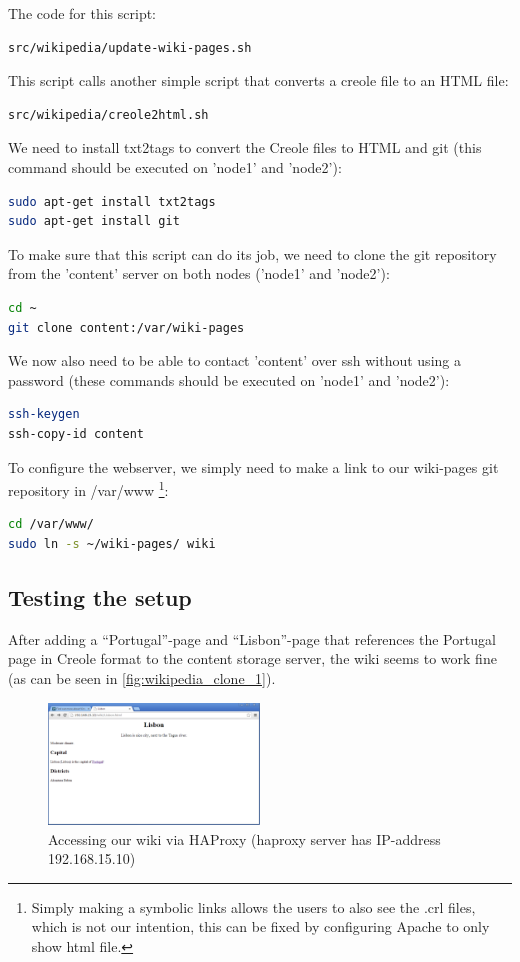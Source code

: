 \documentclass[12pt]{report}
\begin{document}
The code for this script:
 \begin{lstlisting}[language=bash]
src/wikipedia/update-wiki-pages.sh
\end{lstlisting}
This script calls another simple script that converts a creole file to
an HTML file:
 \begin{lstlisting}[language=bash]
src/wikipedia/creole2html.sh
\end{lstlisting}

We need to install txt2tags to convert the Creole files to HTML and git (this
command should be executed on 'node1' and 'node2'):
\begin{lstlisting}[language=bash]
sudo apt-get install txt2tags
sudo apt-get install git
\end{lstlisting}

To make sure that this script can do its job, we need to clone the git
repository from the 'content' server on both nodes ('node1' and 'node2'):
 \begin{lstlisting}[language=bash]
cd ~
git clone content:/var/wiki-pages
\end{lstlisting}
We now also need to be able to contact 'content' over ssh without using
a password (these commands should be executed on 'node1' and 'node2'):
\begin{lstlisting}[language=bash]
ssh-keygen
ssh-copy-id content
\end{lstlisting}

To configure the webserver, we simply need to make a link to our
wiki-pages git repository in /var/www \footnote{Simply making a
  symbolic links allows the users to also see the .crl files, which is
  not our intention, this can be fixed by configuring Apache to only
  show html file.}:
\begin{lstlisting}[language=bash]
cd /var/www/
sudo ln -s ~/wiki-pages/ wiki
\end{lstlisting}

\subsection{Testing the setup}
After adding a ``Portugal''-page and ``Lisbon''-page that references
the Portugal page in Creole format to the content storage server, the
wiki seems to work fine (as can be seen in \ref{fig:wikipedia_clone_1}).

\begin{figure}[h!]
  \caption{Accessing our wiki via HAProxy (haproxy server has
    IP-address 192.168.15.10)}
  \label{wikipedia_clone_1}
  \centering
    \includegraphics[width=0.5\textwidth]{pics/wikipedia_clone_1.png}
\end{figure}
\end{document}
